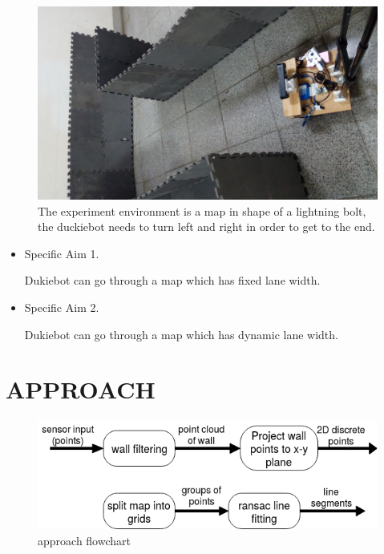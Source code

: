 \documentclass[letterpaper, 10 pt, conference]{ieeeconf}  %
\begin{document}
\begin{figure}[h!] %
\includegraphics[width=0.8\columnwidth]{map.jpg}
\centering
\caption{The experiment environment is a map in shape of a lightning bolt, the duckiebot needs to turn left and right in order to get to the end. 
}
\end{figure}

\begin{itemize}

\item Specific Aim 1.

Dukiebot can go through a map which has fixed lane width.
\item Specific Aim 2.

Dukiebot can go through a map which has dynamic lane width.
\end{itemize}

\section{APPROACH}


\begin{figure}[ht] %
\includegraphics[width=1.0\columnwidth]{approach1.png}
\centering
\caption{approach flowchart}
\end{figure}
\end{document}
